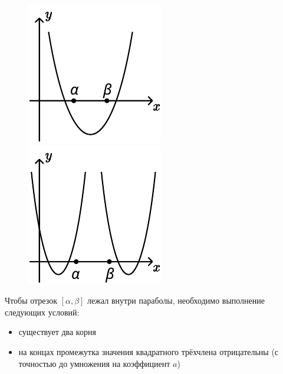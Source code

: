 \begin {figure}[h]
    \begin {minipage} [t] {0.5\linewidth}
        \centering
        \includegraphics [width=0.6\linewidth] {image/image_08.pdf}
    \end {minipage}
    \hfill
    \begin {minipage} [t] {0.5\linewidth}
        \centering
        \includegraphics [width=0.6\linewidth] {image/image_09.pdf}
    \end {minipage}
\end {figure}

Чтобы отрезок $[\alpha, \beta]$ лежал внутри параболы, необходимо выполнение следующих условий:

\begin {itemize}
    \item {существует два корня}
    \item {на концах промежутка значения квадратного трёхчлена отрицательны (с точностью до 
        умножения на коэффициент $a$)}
\end {itemize}

